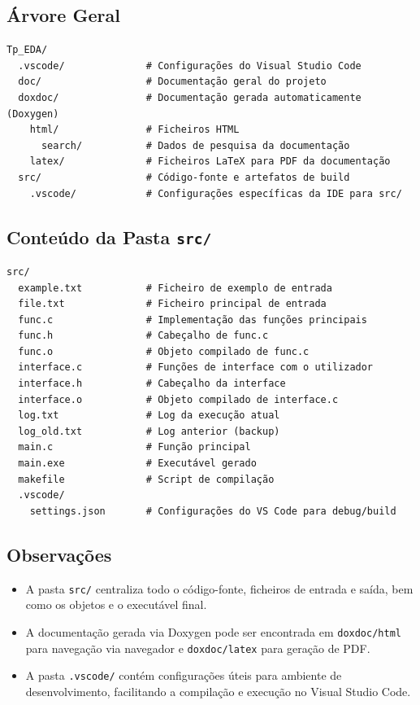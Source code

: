 \documentclass[a4paper,12pt]{article}
\begin{document}
\subsection*{Árvore Geral}
\begin{verbatim}
Tp_EDA/
  .vscode/              # Configurações do Visual Studio Code
  doc/                  # Documentação geral do projeto
  doxdoc/               # Documentação gerada automaticamente (Doxygen)
    html/               # Ficheiros HTML
      search/           # Dados de pesquisa da documentação
    latex/              # Ficheiros LaTeX para PDF da documentação
  src/                  # Código-fonte e artefatos de build
    .vscode/            # Configurações específicas da IDE para src/
\end{verbatim}

\subsection*{Conteúdo da Pasta \texttt{src/}}
\begin{verbatim}
src/
  example.txt           # Ficheiro de exemplo de entrada
  file.txt              # Ficheiro principal de entrada
  func.c                # Implementação das funções principais
  func.h                # Cabeçalho de func.c
  func.o                # Objeto compilado de func.c
  interface.c           # Funções de interface com o utilizador
  interface.h           # Cabeçalho da interface
  interface.o           # Objeto compilado de interface.c
  log.txt               # Log da execução atual
  log_old.txt           # Log anterior (backup)
  main.c                # Função principal
  main.exe              # Executável gerado
  makefile              # Script de compilação
  .vscode/
    settings.json       # Configurações do VS Code para debug/build
\end{verbatim}

\subsection*{Observações}
\begin{itemize}
    \item A pasta \texttt{src/} centraliza todo o código-fonte, ficheiros de entrada e saída, bem como os objetos e o executável final.
    \item A documentação gerada via Doxygen pode ser encontrada em \texttt{doxdoc/html} para navegação via navegador e \texttt{doxdoc/latex} para geração de PDF.
    \item A pasta \texttt{.vscode/} contém configurações úteis para ambiente de desenvolvimento, facilitando a compilação e execução no Visual Studio Code.
\end{itemize}
\end{document}

